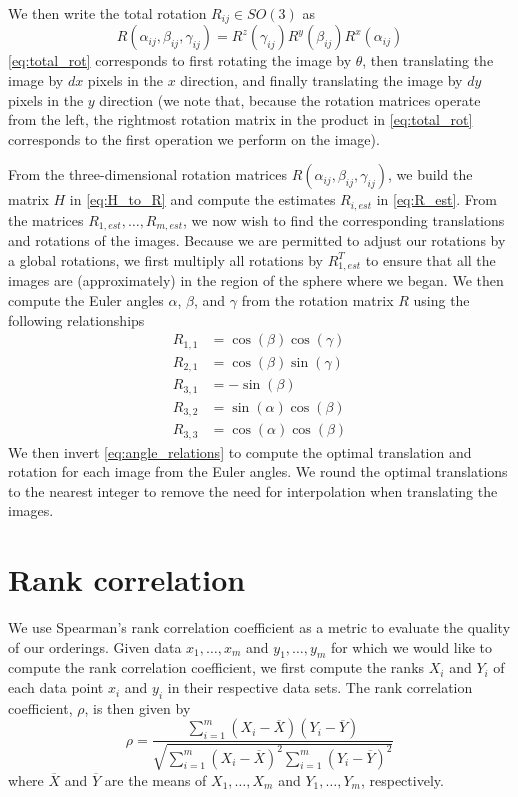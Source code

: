 \documentclass{pnastwo}
\begin{document}
\begin{article}
\begin{materials}
%
We then write the total rotation $R_{ij} \in SO(3)$ as 
\begin{equation} \label{eq:total_rot}
	R(\alpha_{ij}, \beta_{ij}, \gamma_{ij})	 = R^z(\gamma_{ij})  R^y(\beta_{ij})  R^x(\alpha_{ij})
\end{equation}
%
\eqref{eq:total_rot} corresponds to first rotating the image by $\theta$, then translating the image by $dx$ pixels in the $x$ direction, and finally translating the image by $dy$ pixels in the $y$ direction (we note that, because the rotation matrices operate from the left, the rightmost rotation matrix in the product in \eqref{eq:total_rot} corresponds to the first operation we perform on the image).

From the three-dimensional rotation matrices $R(\alpha_{ij}, \beta_{ij}, \gamma_{ij})$,
we build the matrix $H$ in \eqref{eq:H_to_R} and compute the estimates $R_{i, est}$ in \eqref{eq:R_est}.
%
From the matrices $R_{1, est}, \dots, R_{m, est}$, we now wish to find the corresponding translations and rotations of the images.
%
Because we are permitted to adjust our rotations by a global rotations, we first multiply all rotations by $R_{1, est}^T$ to ensure that all the images are (approximately) in the region of the sphere where we began.
%
We then compute the Euler angles $\alpha$, $\beta$, and $\gamma$ from the rotation matrix $R$ using the following relationships
\begin{equation}
\begin{aligned}
R_{1,1} & = \cos(\beta)\cos(\gamma) \\
R_{2,1} & = \cos(\beta)\sin(\gamma) \\
R_{3,1} & = -\sin(\beta) \\
R_{3,2} & = \sin(\alpha)\cos(\beta) \\
R_{3,3} & = \cos(\alpha)\cos(\beta) 
\end{aligned}
\end{equation}
%
We then invert \eqref{eq:angle_relations} to compute the optimal translation and rotation for each image from the Euler angles.
%
We round the optimal translations to the nearest integer to remove the need for interpolation when translating the images.  

\section{Rank correlation}

We use Spearman's rank correlation coefficient as a metric to evaluate the quality of our orderings.
%
Given data $x_1, \dots, x_m$ and $y_1, \dots, y_m$ for which we would like to compute the rank correlation coefficient, we first compute the ranks $X_i$ and $Y_i$ of each data point $x_i$ and $y_i$ in their respective data sets.
%
The rank correlation coefficient, $\rho$, is then given by
\begin{equation}
\rho = \frac{\sum_{i=1}^m (X_i - \overline{X})(Y_i - \overline{Y})}{\sqrt{\sum_{i=1}^m (X_i - \overline{X})^2 \sum_{i=1}^m (Y_i - \overline{Y})^2}}
\end{equation}
where $\overline{X}$ and $\overline{Y}$ are the means of $X_1, \dots, X_m$ and $Y_1, \dots, Y_m$, respectively.


\end{materials}
\end{article}
\end{document}
